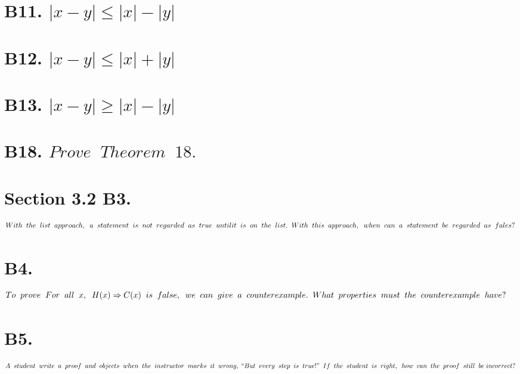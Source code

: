 \section*{B11. $|x-y| \leq |x| - |y|$}

\section*{B12. $|x-y| \leq |x| + |y|$}

\section*{B13. $|x-y| \geq |x| - |y|$}

\section*{B18. $Prove \;\; Theorem \;\; 18.$}

\section*{Section 3.2 B3. $With \;\; the \;\; list \;\; approach, \;\; a \;\; statement \;\; is \;\; not \;\; regarded \;\; as \;\; true \;\; until \\ it \;\; is \;\; on \;\; the \;\; list. \;\; With \;\; this \;\; approach, \;\; when \;\; can \;\; a \;\; statement \;\; be \;\; regarded \;\; as \;\; fales?$}

\section*{B4. $To \;\; prove \;\; For \;\; all \;\; x, \;\; H(x) \Rightarrow C(x) \;\; is \;\; false, \;\; we \;\; can \;\; give \;\; a \;\; counterexample. \\ \;\; What \;\; properties \;\; must \;\; the \;\; counterexample \;\; have?$}

\section*{B5. $A \;\; student \;\; write \;\; a \;\; proof \;\; and \;\; objects \;\; when \;\; the \;\; instructor \;\; marks \;\; it \;\; wrong, \;\; \\ ``But \;\; every \;\; step \;\; is \;\; true!" \;\; If \;\; the \;\; student \;\; is \;\; right, \;\; how \;\; can \;\; the \;\; proof \;\; still \;\; be \;\; \\ incorrect?$}

